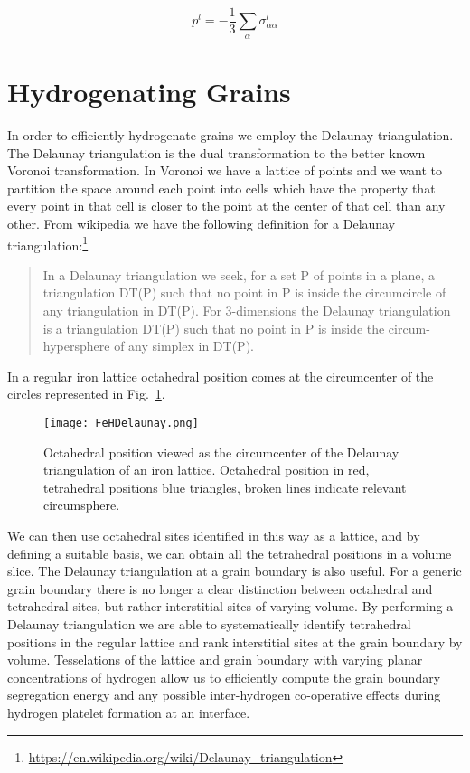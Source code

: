 \documentclass{article}
\begin{document}
\begin{equation}
p^{l} = - \frac{1}{3}\sum_{\alpha} \sigma^{l}_{\alpha \alpha}
\end{equation}

\section{Hydrogenating Grains}
In order to efficiently hydrogenate grains we employ the 
Delaunay triangulation. The Delaunay triangulation is the dual transformation
to the better known Voronoi transformation. In Voronoi we have a lattice of
points and we want to partition the space around each 
point into cells which have the property
that every point in that cell is closer to the point
at the center of that cell than any other.
%
From wikipedia we have the following definition for a Delaunay
triangulation:\footnote{\url{https://en.wikipedia.org/wiki/Delaunay_triangulation}}
\begin{quote}
In a Delaunay triangulation we seek, for a set P of points in a plane, a triangulation
DT(P) such that no point in P is inside the circumcircle of any triangulation in DT(P). For
3-dimensions the Delaunay triangulation is a triangulation DT(P) such 
that no point in P is inside the circum-hypersphere of any simplex in DT(P).
\end{quote}
In a regular iron lattice octahedral position comes at the circumcenter of
the circles represented in Fig.~\ref{fig:delaunay}. 
%
\begin{figure}[!tbp]
\begin{center}
\texttt{[image: FeHDelaunay.png]}
\caption{Octahedral position viewed as the circumcenter of the Delaunay triangulation 
of an iron lattice. Octahedral position in red, tetrahedral positions 
blue triangles, broken lines indicate relevant circumsphere.
\label{fig:delaunay}}
\end{center}
\end{figure}
%
We can then use octahedral sites identified in this way as a lattice, 
and by defining a suitable basis, we can obtain all the
tetrahedral positions in a volume slice. The Delaunay 
triangulation at a grain boundary is also useful. For a generic
grain boundary there is no longer a clear distinction between 
octahedral and tetrahedral sites, but rather interstitial sites
of varying volume. By performing a Delaunay triangulation we 
are able to systematically identify tetrahedral
positions in the regular lattice and rank interstitial sites at 
the grain boundary by volume. Tesselations
of the lattice and grain boundary with varying planar concentrations 
of hydrogen allow us to efficiently compute the grain boundary 
segregation energy and any possible inter-hydrogen co-operative 
effects during hydrogen platelet formation at an interface.
\end{document}
